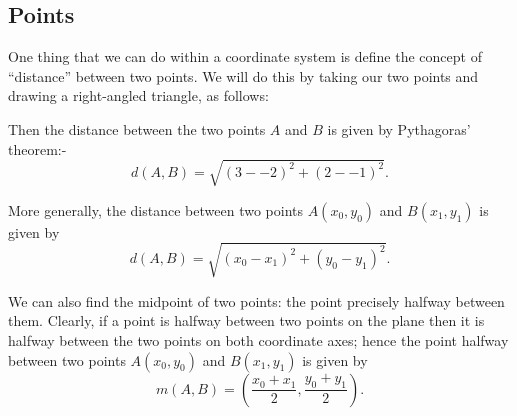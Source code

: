 \subsection*{Points}
One thing that we can do within a coordinate system is define the concept of ``distance'' between two points. We will do this by taking our two
points and drawing a right-angled triangle, as follows:

\begin{center}
\end{center}

Then the distance between the two points $ A $ and $ B $ is given by Pythagoras' theorem:-
\begin{displaymath}
  d(A,B) = \sqrt{(3 - -2)^2 + (2 - -1)^2}.
\end{displaymath}

More generally, the distance between two points $ A(x_0, y_0) $ and $ B(x_1, y_1) $ is given by
\begin{displaymath}
  d(A,B) = \sqrt{(x_0 - x_1)^2 + (y_0 - y_1)^2}.
\end{displaymath}

We can also find the midpoint of two points: the point precisely halfway between them. Clearly, if a point is halfway
between two points on the plane then it is halfway between the two points on both coordinate axes; hence the point
halfway between two points $ A(x_0, y_0) $ and $ B(x_1, y_1) $ is given by
\begin{displaymath}
  m(A,B) = \left(\frac{x_0 + x_1}{2}, \frac{y_0 + y_1}{2}\right).
\end{displaymath}

\clearpage
